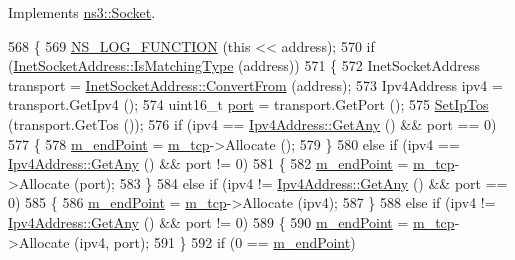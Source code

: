 Implements \hyperlink{classns3_1_1Socket_ada93439a43de2028b5a8fc6621dad482}{ns3\+::\+Socket}.


\begin{DoxyCode}
568 \{
569   \hyperlink{log-macros-disabled_8h_a90b90d5bad1f39cb1b64923ea94c0761}{NS\_LOG\_FUNCTION} (\textcolor{keyword}{this} << address);
570   \textcolor{keywordflow}{if} (\hyperlink{classns3_1_1InetSocketAddress_a9426766e34e928ce5dbdbeb9563a10df}{InetSocketAddress::IsMatchingType} (address))
571     \{
572       InetSocketAddress transport = \hyperlink{classns3_1_1InetSocketAddress_ade776b1109e7b9a7be0b22ced49931e3}{InetSocketAddress::ConvertFrom} (address);
573       Ipv4Address ipv4 = transport.GetIpv4 ();
574       uint16\_t \hyperlink{dsdv-manet_8cc_a8e0798404bf2cf5dabb84c5ba9a4f236}{port} = transport.GetPort ();
575       \hyperlink{classns3_1_1Socket_a2a21a2d166ec2adf766b84d984d1cf65}{SetIpTos} (transport.GetTos ());
576       \textcolor{keywordflow}{if} (ipv4 == \hyperlink{classns3_1_1Ipv4Address_a7a39b330c8e701183a411d5779fca1a4}{Ipv4Address::GetAny} () && port == 0)
577         \{
578           \hyperlink{classns3_1_1TcpSocketBase_a78a4181c0a7394749110ea6b194de467}{m\_endPoint} = \hyperlink{classns3_1_1TcpSocketBase_a26b979e55b02e0aed76cb84c39a66bc7}{m\_tcp}->Allocate ();
579         \}
580       \textcolor{keywordflow}{else} \textcolor{keywordflow}{if} (ipv4 == \hyperlink{classns3_1_1Ipv4Address_a7a39b330c8e701183a411d5779fca1a4}{Ipv4Address::GetAny} () && port != 0)
581         \{
582           \hyperlink{classns3_1_1TcpSocketBase_a78a4181c0a7394749110ea6b194de467}{m\_endPoint} = \hyperlink{classns3_1_1TcpSocketBase_a26b979e55b02e0aed76cb84c39a66bc7}{m\_tcp}->Allocate (port);
583         \}
584       \textcolor{keywordflow}{else} \textcolor{keywordflow}{if} (ipv4 != \hyperlink{classns3_1_1Ipv4Address_a7a39b330c8e701183a411d5779fca1a4}{Ipv4Address::GetAny} () && port == 0)
585         \{
586           \hyperlink{classns3_1_1TcpSocketBase_a78a4181c0a7394749110ea6b194de467}{m\_endPoint} = \hyperlink{classns3_1_1TcpSocketBase_a26b979e55b02e0aed76cb84c39a66bc7}{m\_tcp}->Allocate (ipv4);
587         \}
588       \textcolor{keywordflow}{else} \textcolor{keywordflow}{if} (ipv4 != \hyperlink{classns3_1_1Ipv4Address_a7a39b330c8e701183a411d5779fca1a4}{Ipv4Address::GetAny} () && port != 0)
589         \{
590           \hyperlink{classns3_1_1TcpSocketBase_a78a4181c0a7394749110ea6b194de467}{m\_endPoint} = \hyperlink{classns3_1_1TcpSocketBase_a26b979e55b02e0aed76cb84c39a66bc7}{m\_tcp}->Allocate (ipv4, port);
591         \}
592       \textcolor{keywordflow}{if} (0 == \hyperlink{classns3_1_1TcpSocketBase_a78a4181c0a7394749110ea6b194de467}{m\_endPoint})

\end{DoxyCode}
